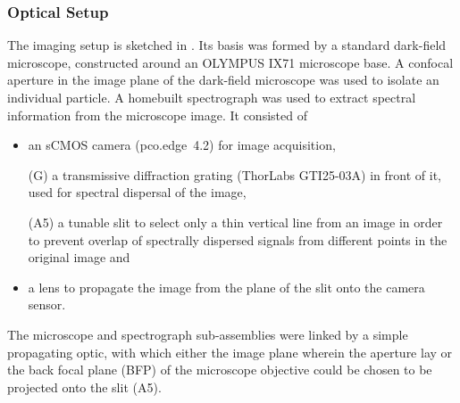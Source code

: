 \documentclass[10pt]{article}
\newcommand{\reffig}[2]{\mbox{\sffamily{Figure \ref{#1}#2}}}
\begin{document}
\subsubsection*{Optical Setup}

The imaging setup is sketched in \reffig{fig:setup}{C}. 
Its basis was formed by a standard dark-field microscope, constructed around an {\sffamily OLYMPUS IX71} microscope base. 
A confocal aperture in the image plane of the dark-field microscope was used to isolate an individual particle. 
A homebuilt spectrograph was used to extract spectral information from the microscope image. 
It consisted of 
\begin{itemize}
    \item an sCMOS camera \mbox{\sffamily(pco.edge 4.2)} for image acquisition, 
    \item[{\sffamily(G)}] a transmissive diffraction grating {\sffamily(ThorLabs GTI25-03A)} in front of it, used for spectral dispersal of the image,
    \item[{\sffamily(A5)}] a tunable slit to select only a thin vertical line from an image in order to prevent overlap of spectrally dispersed signals from different points in the original image and
    \item a lens to propagate the image from the plane of the slit onto the camera sensor.  
\end{itemize}
The microscope and spectrograph sub-assemblies were linked by a simple propagating optic, with which either the image plane wherein the aperture lay or the back focal plane (BFP) of the microscope objective could be chosen to be projected onto the slit {\sffamily(A5)}. 

\end{document}
